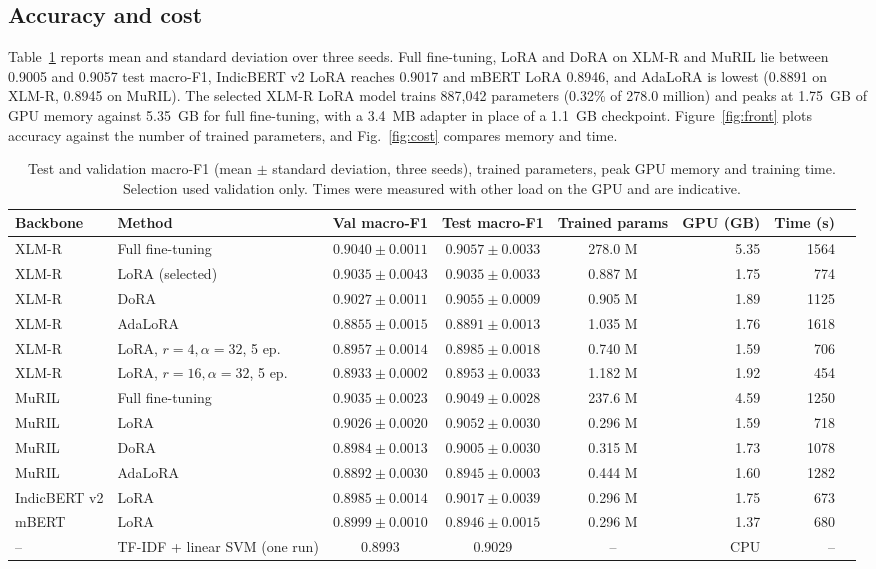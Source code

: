 \documentclass[conference]{IEEEtran}
\begin{document}
\subsection{Accuracy and cost}
Table~\ref{tab:main} reports mean and standard deviation over three seeds. Full fine-tuning, LoRA and DoRA on XLM-R and MuRIL lie between 0.9005 and 0.9057 test macro-F1, IndicBERT v2 LoRA reaches 0.9017 and mBERT LoRA 0.8946, and AdaLoRA is lowest (0.8891 on XLM-R, 0.8945 on MuRIL). The selected XLM-R LoRA model trains 887,042 parameters (0.32\% of 278.0 million) and peaks at 1.75~GB of GPU memory against 5.35~GB for full fine-tuning, with a 3.4~MB adapter in place of a 1.1~GB checkpoint. Figure~\ref{fig:front} plots accuracy against the number of trained parameters, and Fig.~\ref{fig:cost} compares memory and time.

\begin{table}[t]
\caption{Test and validation macro-F1 (mean $\pm$ standard deviation, three seeds), trained parameters, peak GPU memory and training time. Selection used validation only. Times were measured with other load on the GPU and are indicative.}
\label{tab:main}
\centering
\footnotesize
\setlength{\tabcolsep}{5pt}
\begin{tabular}{llcccrrr}
\toprule
Backbone & Method & Val macro-F1 & Test macro-F1 & Trained params & GPU (GB) & Time (s) \\
\midrule
XLM-R & Full fine-tuning & $0.9040\pm0.0011$ & $0.9057\pm0.0033$ & 278.0 M & 5.35 & 1564 \\
XLM-R & LoRA (selected) & $0.9035\pm0.0043$ & $0.9035\pm0.0033$ & 0.887 M & 1.75 & 774 \\
XLM-R & DoRA & $0.9027\pm0.0011$ & $0.9055\pm0.0009$ & 0.905 M & 1.89 & 1125 \\
XLM-R & AdaLoRA & $0.8855\pm0.0015$ & $0.8891\pm0.0013$ & 1.035 M & 1.76 & 1618 \\
XLM-R & LoRA, $r{=}4,\alpha{=}32$, 5 ep.\ \cite{kaunang2026indo} & $0.8957\pm0.0014$ & $0.8985\pm0.0018$ & 0.740 M & 1.59 & 706 \\
XLM-R & LoRA, $r{=}16,\alpha{=}32$, 5 ep. & $0.8933\pm0.0002$ & $0.8953\pm0.0033$ & 1.182 M & 1.92 & 454 \\
MuRIL & Full fine-tuning & $0.9035\pm0.0023$ & $0.9049\pm0.0028$ & 237.6 M & 4.59 & 1250 \\
MuRIL & LoRA & $0.9026\pm0.0020$ & $0.9052\pm0.0030$ & 0.296 M & 1.59 & 718 \\
MuRIL & DoRA & $0.8984\pm0.0013$ & $0.9005\pm0.0030$ & 0.315 M & 1.73 & 1078 \\
MuRIL & AdaLoRA & $0.8892\pm0.0030$ & $0.8945\pm0.0003$ & 0.444 M & 1.60 & 1282 \\
IndicBERT v2 & LoRA & $0.8985\pm0.0014$ & $0.9017\pm0.0039$ & 0.296 M & 1.75 & 673 \\
mBERT & LoRA & $0.8999\pm0.0010$ & $0.8946\pm0.0015$ & 0.296 M & 1.37 & 680 \\
-- & TF-IDF + linear SVM (one run) & 0.8993 & 0.9029 & -- & CPU & -- \\
\bottomrule
\end{tabular}
\end{table}
\end{document}
